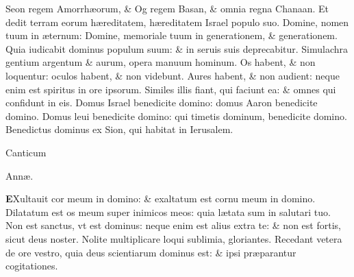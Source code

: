 \documentclass[a5paper,10pt]{book}
\def\rightmarginnote{%
	\lrmarginnote{\hskip\columnwidth \hskip -1em}}
\def\ae{æ}
\begin{document}
\begin{multicols*}{2}
\newline \color{red} S\color{black}eon regem Amorrh\ae orum, \& Og regem Basan, \& omnia regna Chanaan.
\newline \color{red} E\color{black}t dedit terram eorum h\ae reditatem, h\ae reditatem Israel populo suo.
\newline \color{red} D\color{black}omine, nomen tuum in \ae ternum: Domine, memoriale tuum in generationem, \& generationem.
\newline \color{red} Q\color{black}uia iudicabit dominus populum suum: \& in seruis suis deprecabitur.
\newline \color{red} S\color{black}imulachra gentium argentum \& aurum, opera manuum hominum.
\newline \color{red} O\color{black}s habent, \& non loquentur: oculos habent, \& non videbunt.
\newline \color{red} A\color{black}ures habent, \& non audient: neque enim est spiritus in ore ipsorum.
\newline \color{red} S\color{black}imiles illis fiant, qui faciunt ea: \& omnes qui confidunt in eis.
\newline \color{red} D\color{black}omus Israel benedicite domino: domus Aaron benedicite domino.
\newline \color{red} D\color{black}omus leui benedicite domino: qui timetis dominum, benedicite domino.
\newline \color{red} B\color{black}enedictus dominus ex Sion, qui habitat in Ierusalem.
\vspace{-1em}
\begin{center} \color{red}
\hypertarget{Anna}{Canticum} Ann\ae .
\end{center}
\vspace{-1em}
\lettrine[lines=2]{\bfseries \color{red} E}{}Xultauit\rightmarginnote{j. reg.\\2.} cor meum in domino: \& exaltatum est cornu meum in domino.%
\newline \color{red} D\color{black}ilatatum est os meum super inimicos meos: quia l\ae tata sum in salutari tuo.
\newline \color{red} N\color{black}on est sanctus, vt est dominus: neque enim est alius extra te: \& non est fortis, sicut deus noster.
\newline \color{red} N\color{black}olite multiplicare loqui sublimia, gloriantes.
\newline \color{red} R\color{black}ecedant vetera de ore vestro, quia deus scientiarum dominus est: \& ipsi pr\ae parantur cogitationes.

\end{multicols*}
\end{document}
